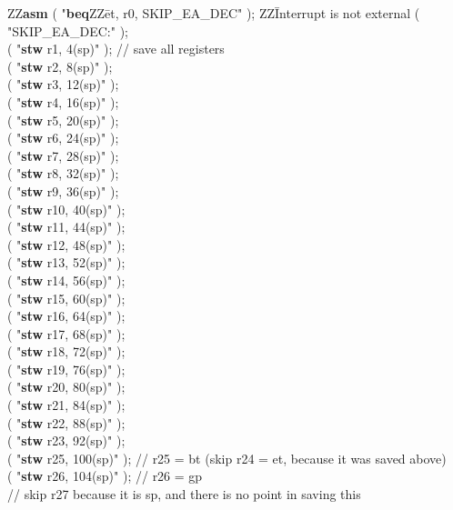 \begin{center}
\begin{minipage}[t]{12.5 cm}
\begin{tabbing}
ZZ\={\bf asm} ( "{\bf beq}ZZ\=et, r0, SKIP\_EA\_DEC" ); ZZ\= Interrupt is not external\kill 
{} ( "SKIP\_EA\_DEC:" );\\
 ( "{\bf stw} \>r1,  4(sp)" );			\>// save all registers \\
 ( "{\bf stw} \>r2,  8(sp)" );\\
 ( "{\bf stw} \>r3,  12(sp)" );\\
 ( "{\bf stw} \>r4,  16(sp)" );\\
 ( "{\bf stw} \>r5,  20(sp)" );\\
 ( "{\bf stw} \>r6,  24(sp)" );\\
 ( "{\bf stw} \>r7,  28(sp)" );\\
 ( "{\bf stw} \>r8,  32(sp)" );\\
 ( "{\bf stw} \>r9,  36(sp)" );\\
 ( "{\bf stw} \>r10, 40(sp)" );\\
 ( "{\bf stw} \>r11, 44(sp)" );\\
 ( "{\bf stw} \>r12, 48(sp)" );\\
 ( "{\bf stw} \>r13, 52(sp)" );\\
 ( "{\bf stw} \>r14, 56(sp)" );\\
 ( "{\bf stw} \>r15, 60(sp)" );\\
 ( "{\bf stw} \>r16, 64(sp)" );\\
 ( "{\bf stw} \>r17, 68(sp)" );\\
 ( "{\bf stw} \>r18, 72(sp)" );\\
 ( "{\bf stw} \>r19, 76(sp)" );\\
 ( "{\bf stw} \>r20, 80(sp)" );\\
 ( "{\bf stw} \>r21, 84(sp)" );\\
 ( "{\bf stw} \>r22, 88(sp)" );\\
 ( "{\bf stw} \>r23, 92(sp)" );\\
 ( "{\bf stw} \>r25, 100(sp)" ); \>// r25 = bt (skip r24 = et, because it was saved above)\\
 ( "{\bf stw} \>r26, 104(sp)" ); \>// r26 = gp\\
\>// skip r27 because it is sp, and there is no point in saving this\\

\end{tabbing}
\end{minipage}
\end{center}

